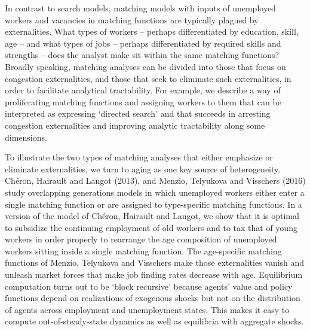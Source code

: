 In contrast to search models, matching models with inputs
of unemployed workers and vacancies in matching functions are
typically plagued by externalities. What types of workers -- perhaps
differentiated by education, skill, age -- and what types of jobs
-- perhaps differentiated by required skills and strengths  --
does the analyst make sit within the same matching functions?
Broadly speaking, matching analyses can be divided into those
that focus on  congestion externalities, and those that
seek to eliminate such  externalities, in order to facilitate analytical
tractability.
For example, we  describe a way
of proliferating matching functions and  assigning workers to them  that can be interpreted as  expressing
 `directed search' and that succeeds in arresting congestion
externalities and improving analytic tractability along some dimensions.





  
  

To illustrate the two types of matching analyses that either
emphasize or eliminate externalities, we turn to aging as one
key source of heterogeneity. Ch\'eron,
Hairault and Langot (2013), and Menzio, Telyukova and Visschers (2016)
study overlapping generations models in which unemployed
workers either enter a single matching function or are assigned
to type-specific matching functions. In a version of the
model of Ch\'eron, Hairault and Langot, we show that it is optimal  to subsidize the continuing employment
of old workers and to tax that of young workers  in order properly
to rearrange  the age composition of  unemployed workers sitting inside
 a single matching function. The
age-specific matching functions of
Menzio, Telyukova and Visschers make
those externalities vanish and unleash market forces that make job finding rates decrease with
 age.
Equilibrium computation  turns out to be `block recursive' because agents' value and policy functions depend on
realizations of  exogenous shocks but not on the distribution
of agents across employment and unemployment states. This
makes it easy to compute out-of-steady-state dynamics
as well as equilibria with aggregate shocks.


